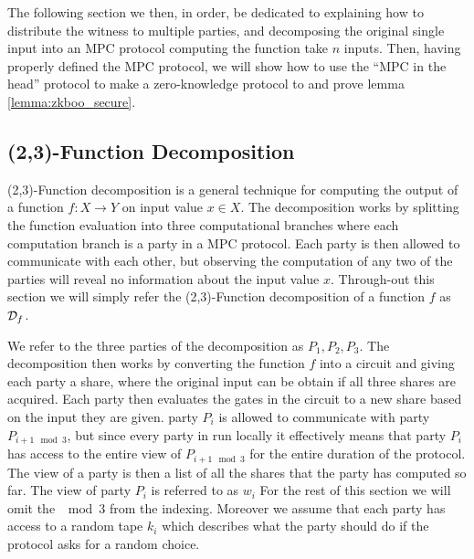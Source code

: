The following section we then, in order, be dedicated to explaining how to
distribute the witness to multiple parties, and decomposing the original single
input into an MPC protocol computing the function take $n$ inputs. Then, having
properly defined the MPC protocol, we will show how to use the ``MPC in the
head'' protocol to make a zero-knowledge protocol to and prove lemma \ref{lemma:zkboo_secure}.

\subsection{(2,3)-Function Decomposition}
\label{subsec:decomposition}
(2,3)-Function decomposition is a general technique for computing the output of
a function $f : X \rightarrow Y$ on input value $x \in X$.
The decomposition works by splitting the function evaluation into three
computational branches where each computation branch is a party in a MPC
protocol. Each party is then allowed to communicate with each other, but
observing the computation of any two of the parties will reveal no information
about the input value $x$.
Through-out this section we will simply refer the (2,3)-Function decomposition
of a function $f$ as $\mathcal{D}_{f}$.

We refer to the three parties of the decomposition as $P_{1}, P_{2}, P_{3}$. The
decomposition then works by converting the function $f$ into a circuit and
giving each party a share, where the original input can be obtain if all three
shares are acquired. Each party then evaluates the gates in the circuit to a new
share based on the input they are given. party $P_{i}$ is allowed to communicate
with party $P_{i+1 \mod 3}$, but since every party in run locally it effectively
means that party $P_{i}$ has access to the entire view of $P_{i+1 \mod 3}$ for
the entire duration of the protocol. The view of a party is then a list  of all the shares that
the party has computed so far. The view of party $P_{i}$ is referred to as
$w_{i}$ For the rest of this section we will omit the $\mod 3$ from the
indexing. Moreover we assume that each party has access to a random tape $k_{i}$
which describes what the party should do if the protocol asks for a random
choice.

